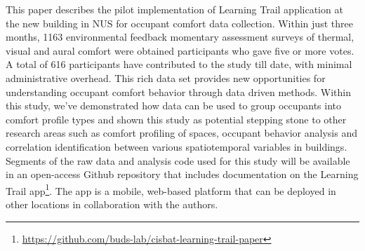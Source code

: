 
This paper describes the pilot implementation of Learning Trail application at the new building in NUS for occupant comfort data collection. Within just three months, 1163 environmental feedback momentary assessment surveys of thermal, visual and aural comfort were obtained participants who gave five or more votes. A total of 616 participants have contributed to the study till date, with minimal administrative overhead. This rich data set provides new opportunities for understanding occupant comfort behavior through data driven methods. Within this study, we've demonstrated how data can be used to group occupants into comfort profile types and shown this study as potential stepping stone to other research areas such as comfort profiling of spaces, occupant behavior analysis and correlation identification between various spatiotemporal variables in buildings. 
Segments of the raw data and analysis code used for this study will be available in an open-access Github repository that includes documentation on the Learning Trail app\footnote{\url{https://github.com/buds-lab/cisbat-learning-trail-paper}}. The app is a mobile, web-based platform that can be deployed in other locations in collaboration with the authors.





